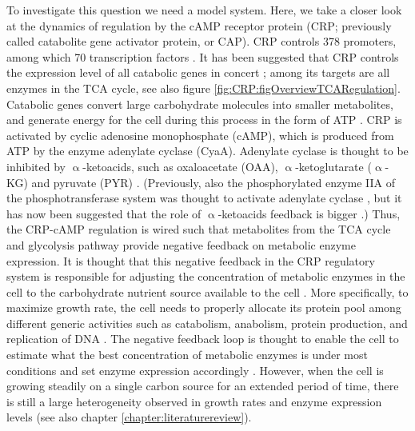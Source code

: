 
To investigate this question we need a model system.
%
Here, we take a closer look at the dynamics of regulation by the cAMP receptor protein (CRP; previously called catabolite gene activator protein, or CAP). 
%
CRP controls 378 promoters, among which 70 transcription factors \cite{Green2014, Shimada2011}.
%
It has been suggested that CRP controls the expression level of all catabolic genes in concert \cite{You2013, Hui2015};
%
among its targets are all enzymes in the TCA cycle, see also figure \ref{fig:CRP:figOverviewTCARegulation}.
%
Catabolic genes convert large carbohydrate molecules into smaller metabolites, and generate energy for the cell during this process in the form of ATP \cite{Nelson2005}.
%
CRP is activated by cyclic adenosine monophosphate (cAMP), 
which is produced from ATP by the enzyme adenylate cyclase (CyaA).
Adenylate cyclase is thought to be inhibited by $\upalpha$-ketoacids, such as oxaloacetate (OAA), $\upalpha$-ketoglutarate ($\upalpha$-KG) and pyruvate (PYR) \cite{You2013}.
(Previously, also the phosphorylated enzyme IIA of the phosphotransferase system was thought to activate adenylate cyclase \cite{Keseler2017, Deutscher2008, Gorke2008}, but it has now been suggested that the role of $\upalpha$-ketoacids feedback is bigger \cite{You2013}.)
%
Thus, the CRP-cAMP regulation is wired such that metabolites from the TCA cycle and glycolysis pathway provide negative feedback on metabolic enzyme expression.
It is thought that this negative feedback in the CRP regulatory system
is responsible for adjusting the concentration of metabolic enzymes in the cell to the carbohydrate nutrient source available to the cell \cite{Towbin2017}. 
%
More specifically, to maximize growth rate, the cell needs to properly allocate its protein pool among different generic activities such as catabolism, anabolism, protein production, and replication of DNA \cite{Hui2015}.
The negative feedback loop is thought to enable the cell to estimate what the best concentration of metabolic enzymes is under most conditions
and set enzyme expression accordingly \cite{Towbin2017}.
%
However, when the cell is growing steadily on a single carbon source for an extended period of time, 
there is still a large heterogeneity observed in growth rates and enzyme expression levels \cite{Kiviet2014} (see also chapter \ref{chapter:literaturereview}).
